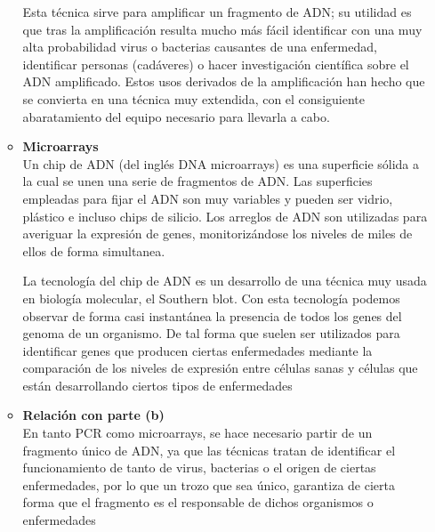 \begin{enumerate}
\begin{itemize}
			Esta técnica sirve para amplificar un fragmento de ADN;
			su utilidad es que tras la amplificación resulta mucho más
			fácil identificar con una muy alta probabilidad virus o
			bacterias causantes de una enfermedad, identificar personas
			(cadáveres) o hacer investigación científica sobre el ADN
			amplificado. Estos usos derivados de la amplificación han
			hecho que se convierta en una técnica muy extendida, con el 
			consiguiente abaratamiento del equipo necesario para
			llevarla a cabo.

		\item \textbf{Microarrays} \\

			Un chip de ADN (del inglés DNA microarrays) es una superficie
			sólida a la cual se unen una serie de fragmentos de ADN.
			Las superficies empleadas para fijar el ADN son muy variables
			y pueden ser vidrio, plástico e incluso chips de silicio. 
			Los arreglos de ADN son utilizadas para averiguar la expresión
			de genes, monitorizándose los niveles de miles de ellos de
			forma simultanea.
			
			La tecnología del chip de ADN es un desarrollo de una técnica
			muy usada en biología molecular, el Southern blot.
			Con esta tecnología podemos observar de forma casi instantánea
			la presencia de todos los genes del genoma de un organismo.
			De tal forma que suelen ser utilizados para identificar genes
			que producen ciertas enfermedades mediante la comparación de
			los niveles de expresión entre células sanas y células que
			están desarrollando ciertos tipos de enfermedades

		\item \textbf{Relación con parte (b)} \\

			En tanto PCR como microarrays, se hace necesario partir de un
			fragmento único de ADN, ya que las técnicas tratan de identificar
			el funcionamiento de tanto de virus, bacterias o el origen de
			ciertas enfermedades, por lo que un trozo que sea único,
			garantiza de cierta forma que el fragmento es el responsable
			de dichos organismos o enfermedades

	\end{itemize}

\end{enumerate}
